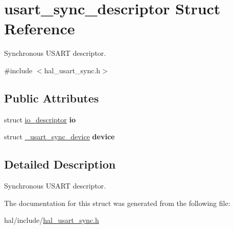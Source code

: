 \hypertarget{structusart__sync__descriptor}{}\section{usart\+\_\+sync\+\_\+descriptor Struct Reference}
\label{structusart__sync__descriptor}


Synchronous U\+S\+A\+RT descriptor.  




{\ttfamily \#include $<$hal\+\_\+usart\+\_\+sync.\+h$>$}

\subsection*{Public Attributes}
\begin{DoxyCompactItemize}
\item 
\mbox{\label{structusart__sync__descriptor_a9ef5dd1d1c2010fc961d3e803c7429cb}} 
struct \hyperlink{structio__descriptor}{io\+\_\+descriptor} {\bfseries io}
\item 
\mbox{\label{structusart__sync__descriptor_a825cfcdd7f23413952a2a198b8a07ad5}} 
struct \hyperlink{struct__usart__sync__device}{\+\_\+usart\+\_\+sync\+\_\+device} {\bfseries device}
\end{DoxyCompactItemize}


\subsection{Detailed Description}
Synchronous U\+S\+A\+RT descriptor. 

The documentation for this struct was generated from the following file\+:\begin{DoxyCompactItemize}
\item 
hal/include/\hyperlink{hal__usart__sync_8h}{hal\+\_\+usart\+\_\+sync.\+h}\end{DoxyCompactItemize}
